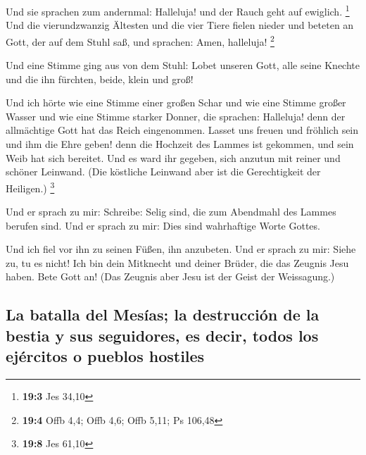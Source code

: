  Und sie sprachen zum andernmal: Halleluja! und der Rauch
geht auf ewiglich. \footnote{\textbf{19:3} Jes 34,10}  Und
die vierundzwanzig Ältesten und die vier Tiere fielen nieder und beteten
an Gott, der auf dem Stuhl saß, und sprachen: Amen, halleluja!
\footnote{\textbf{19:4} Offb 4,4; Offb 4,6; Offb 5,11; Ps 106,48}

 Und eine Stimme ging aus von dem Stuhl: Lobet unseren
Gott, alle seine Knechte und die ihn fürchten, beide, klein und groß!

 Und ich hörte wie eine Stimme einer großen Schar und wie
eine Stimme großer Wasser und wie eine Stimme starker Donner, die
sprachen: Halleluja! denn der allmächtige Gott hat das Reich
eingenommen.  Lasset uns freuen und fröhlich sein und ihm
die Ehre geben! denn die Hochzeit des Lammes ist gekommen, und sein Weib
hat sich bereitet.  Und es ward ihr gegeben, sich anzutun
mit reiner und schöner Leinwand. (Die köstliche Leinwand aber ist die
Gerechtigkeit der Heiligen.) \footnote{\textbf{19:8} Jes 61,10}

 Und er sprach zu mir: Schreibe: Selig sind, die zum
Abendmahl des Lammes berufen sind. Und er sprach zu mir: Dies sind
wahrhaftige Worte Gottes.

 Und ich fiel vor ihn zu seinen Füßen, ihn anzubeten. Und
er sprach zu mir: Siehe zu, tu es nicht! Ich bin dein Mitknecht und
deiner Brüder, die das Zeugnis Jesu haben. Bete Gott an! (Das Zeugnis
aber Jesu ist der Geist der Weissagung.)

\hypertarget{la-batalla-del-mesuxedas-la-destrucciuxf3n-de-la-bestia-y-sus-seguidores-es-decir-todos-los-ejuxe9rcitos-o-pueblos-hostiles}{%
\subsection{La batalla del Mesías; la destrucción de la bestia y sus
seguidores, es decir, todos los ejércitos o pueblos
hostiles}\label{la-batalla-del-mesuxedas-la-destrucciuxf3n-de-la-bestia-y-sus-seguidores-es-decir-todos-los-ejuxe9rcitos-o-pueblos-hostiles}}

